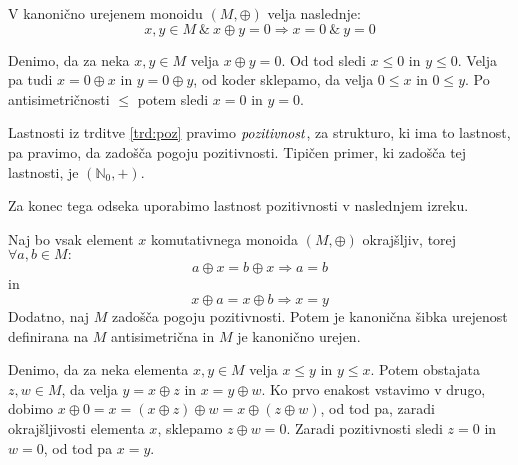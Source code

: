 \documentclass[mat1]{fmfdelo}
\newcommand{\N}{\mathbb{N}}
\newcommand{\No}{\N_0}
\newcommand{\pojem}[1]{\ensuremath{\emph{#1}}}
\begin{document}
\begin{trditev}\label{trd:poz}
	V kanonično urejenem monoidu $(M, \oplus)$ velja naslednje: $$x, y \in M ~\&~ x\oplus y = 0 \Rightarrow x = 0 ~\& ~ y = 0$$
\end{trditev}
\begin{dokaz}
	Denimo, da za neka $x, y\in M$ velja $x \oplus y = 0$. Od tod sledi $x\leq 0$ in $y \leq 0$. Velja pa tudi $x = 0 \oplus x$ in $y = 0 \oplus y$, od koder sklepamo, da velja $0 \leq x$ in $0 \leq y$. Po antisimetričnosti $\leq$ potem sledi $x = 0$ in $y = 0$.
\end{dokaz}

\begin{opomba}
	\label{opomb:poz}
	Lastnosti iz trditve \ref{trd:poz} pravimo \pojem{pozitivnost}, za strukturo, ki ima to lastnost, pa pravimo, da zadošča pogoju pozitivnosti. Tipičen primer, ki zadošča tej lastnosti, je $(\No, +)$. 
\end{opomba}

Za konec tega odseka uporabimo lastnost pozitivnosti v naslednjem izreku.
\begin{izrek}
Naj bo vsak element $x$ komutativnega monoida $(M, \oplus)$ okrajšljiv, torej $\forall a, b\in M:$ $$a\oplus x = b\oplus x \Rightarrow a = b$$ in $$x\oplus a = x\oplus b \Rightarrow x = y$$ Dodatno, naj $M$ zadošča pogoju pozitivnosti. Potem je kanonična šibka urejenost definirana na $M$ antisimetrična in $M$ je kanonično urejen.
\end{izrek}
\begin{dokaz} Denimo, da za neka elementa $x, y\in M$ velja $x\leq y$ in $y\leq x$. Potem obstajata $z, w\in M$, da velja $y = x \oplus z$ in $x = y \oplus w$. Ko prvo enakost vstavimo v drugo, dobimo $x \oplus 0 = x = (x \oplus z) \oplus w = x \oplus (z\oplus w)$, od tod pa, zaradi okrajšljivosti elementa $x$, sklepamo $z\oplus w = 0$. Zaradi pozitivnosti sledi $z = 0$ in $w = 0$, od tod pa $x = y$.
\end{dokaz}
\end{document}
